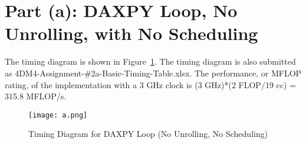 \section*{Part (a): DAXPY Loop, No Unrolling, with No Scheduling}
The timing diagram is shown in Figure~\ref{fig:a}. The timing diagram is also submitted as 4DM4-Assignment-\#2a-Basic-Timing-Table.xlsx. The performance, or MFLOP rating, of the implementation with a 3 GHz clock is (3 GHz)*(2 FLOP/19 cc) = 315.8 MFLOP/s.

\begin{figure}[htp]
\centering
\caption{Timing Diagram for DAXPY Loop (No Unrolling, No Scheduling)}
\texttt{[image: a.png]}
\label{fig:a}
\end{figure}